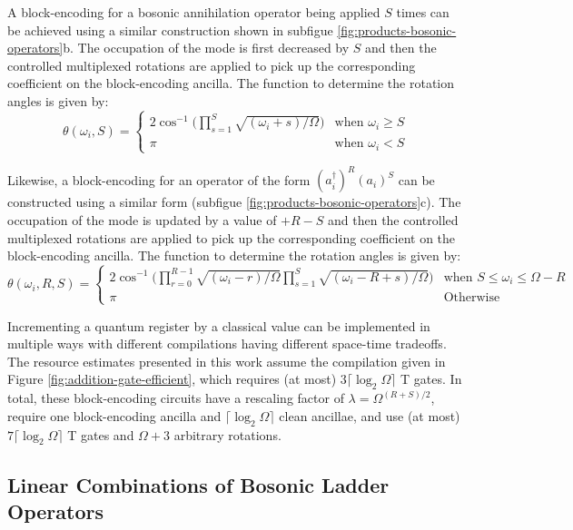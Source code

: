 A block-encoding for a bosonic annihilation operator being applied $S$ times can be achieved using a similar construction shown in subfigue \ref{fig:products-bosonic-operators}b.
The occupation of the mode is first decreased by $S$ and then the controlled multiplexed rotations are applied to pick up the corresponding coefficient on the block-encoding ancilla.
The function to determine the rotation angles is given by:
\begin{equation}
    \theta(\omega_i, S) = 
    \begin{cases} 
        2\cos^{-1}\Big(\prod_{s=1}^{S}\sqrt{(\omega_i + s) / \Omega}\Big) & \text{when } \omega_i \geq S \\
        \pi & \text{when } \omega_i < S
    \end{cases}
\end{equation}

Likewise, a block-encoding for an operator of the form $(a_i^\dagger)^R (a_i)^S$ can be constructed using a similar form (subfigue \ref{fig:products-bosonic-operators}c).
The occupation of the mode is updated by a value of $+ R - S$ and then the controlled multiplexed rotations are applied to pick up the corresponding coefficient on the block-encoding ancilla.
The function to determine the rotation angles is given by:
\begin{equation}
    \theta(\omega_i, R, S) = 
    \begin{cases} 
        2\cos^{-1}\Big(\prod_{r=0}^{R-1}\sqrt{(\omega_i - r) / \Omega} \prod_{s=1}^{S}\sqrt{(\omega_i - R + s) / \Omega}\Big) & \text{when } S \leq \omega_i \leq \Omega - R \\
        \pi & \text{Otherwise} 
    \end{cases}
\end{equation}

Incrementing a quantum register by a classical value can be implemented in multiple ways with different compilations having different space-time tradeoffs.
The resource estimates presented in this work assume the compilation given in Figure \ref{fig:addition-gate-efficient}, which requires (at most) $3 \lceil \log_2 \Omega \rceil$ T gates.
In total, these block-encoding circuits have a rescaling factor of $\lambda = \Omega^{(R+S)/2}$, require one block-encoding ancilla and $\lceil{\log_2{\Omega}}\rceil$ clean ancillae, and use (at most) $7 \lceil \log_2 \Omega \rceil$ T gates and $\Omega + 3$ arbitrary rotations.


\subsection{Linear Combinations of Bosonic Ladder Operators}

